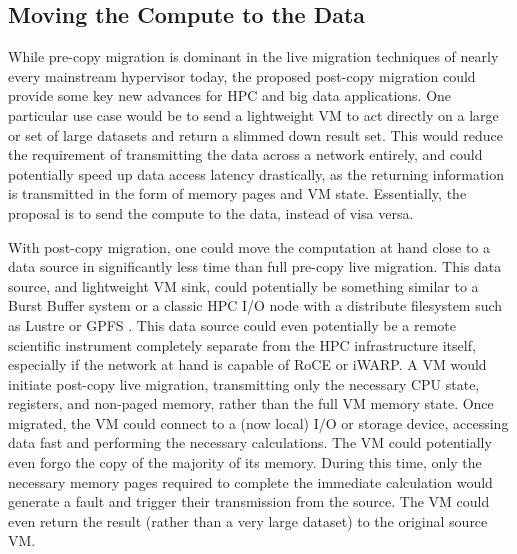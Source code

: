 %
%







\subsection{Moving the Compute to the Data}


While pre-copy migration is dominant in the live migration techniques of nearly every mainstream hypervisor today, the proposed post-copy migration could provide some key new advances for HPC and big data applications. One particular use case would be to send a lightweight VM to act directly on a large or set of large datasets and return a slimmed down result set. This would reduce the requirement of transmitting the data across a network entirely, and could potentially speed up data access latency drastically, as the returning information is transmitted in the form of memory pages and VM state. Essentially, the proposal is to send the compute to the data, instead of visa versa.  

With post-copy migration, one could move the computation at hand close to a data source in significantly less time than full pre-copy live migration. This data source, and lightweight VM sink, could potentially be something similar to a Burst Buffer system \cite{Lofstead2014,wright2015trinity} or a classic HPC I/O node with a distribute filesystem such as Lustre or GPFS \cite{schmuck2002gpfs}. This data source could even potentially be a remote scientific instrument completely separate from the HPC infrastructure itself, especially if the network at hand is capable of RoCE \cite{beck2011roce} or iWARP\cite{rashti200710}.  A VM would initiate post-copy live migration, transmitting  only the necessary CPU state, registers, and non-paged memory, rather than the full VM memory state. Once migrated, the VM could connect to a (now local) I/O or storage device, accessing data fast and performing the necessary calculations. The VM could potentially even forgo the copy of the majority of its memory. During this time, only the necessary memory pages required to complete the immediate calculation would generate a fault and trigger their transmission from the source.  The VM could even return the result (rather than a very large dataset) to the original source VM. 

